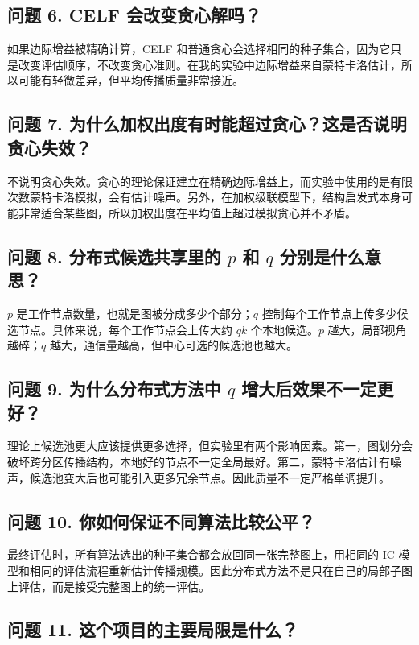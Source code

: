 \documentclass[11pt]{ctexart}
\begin{document}
\subsection*{问题 6. CELF 会改变贪心解吗？}

如果边际增益被精确计算，CELF 和普通贪心会选择相同的种子集合，因为它只是改变评估顺序，不改变贪心准则。在我的实验中边际增益来自蒙特卡洛估计，所以可能有轻微差异，但平均传播质量非常接近。

\subsection*{问题 7. 为什么加权出度有时能超过贪心？这是否说明贪心失效？}

不说明贪心失效。贪心的理论保证建立在精确边际增益上，而实验中使用的是有限次数蒙特卡洛模拟，会有估计噪声。另外，在加权级联模型下，结构启发式本身可能非常适合某些图，所以加权出度在平均值上超过模拟贪心并不矛盾。

\subsection*{问题 8. 分布式候选共享里的 $p$ 和 $q$ 分别是什么意思？}

$p$ 是工作节点数量，也就是图被分成多少个部分；$q$ 控制每个工作节点上传多少候选节点。具体来说，每个工作节点会上传大约 $qk$ 个本地候选。$p$ 越大，局部视角越碎；$q$ 越大，通信量越高，但中心可选的候选池也越大。

\subsection*{问题 9. 为什么分布式方法中 $q$ 增大后效果不一定更好？}

理论上候选池更大应该提供更多选择，但实验里有两个影响因素。第一，图划分会破坏跨分区传播结构，本地好的节点不一定全局最好。第二，蒙特卡洛估计有噪声，候选池变大后也可能引入更多冗余节点。因此质量不一定严格单调提升。

\subsection*{问题 10. 你如何保证不同算法比较公平？}

最终评估时，所有算法选出的种子集合都会放回同一张完整图上，用相同的 IC 模型和相同的评估流程重新估计传播规模。因此分布式方法不是只在自己的局部子图上评估，而是接受完整图上的统一评估。

\subsection*{问题 11. 这个项目的主要局限是什么？}
\end{document}
